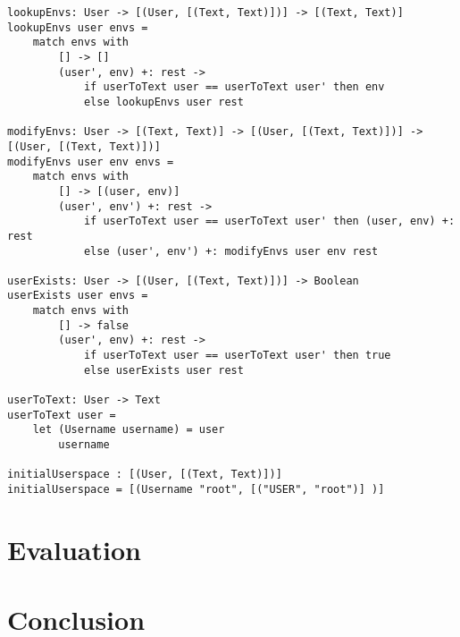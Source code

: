 \documentclass[logo,bsc,singlespacing,parskip]{infthesis}
\begin{document}
\begin{lstlisting}[language=unison]
lookupEnvs: User -> [(User, [(Text, Text)])] -> [(Text, Text)]
lookupEnvs user envs =
    match envs with
        [] -> []
        (user', env) +: rest ->
            if userToText user == userToText user' then env
            else lookupEnvs user rest

modifyEnvs: User -> [(Text, Text)] -> [(User, [(Text, Text)])] -> [(User, [(Text, Text)])]
modifyEnvs user env envs =
    match envs with
        [] -> [(user, env)]
        (user', env') +: rest ->
            if userToText user == userToText user' then (user, env) +: rest
            else (user', env') +: modifyEnvs user env rest

userExists: User -> [(User, [(Text, Text)])] -> Boolean
userExists user envs =
    match envs with
        [] -> false
        (user', env) +: rest ->
            if userToText user == userToText user' then true
            else userExists user rest

userToText: User -> Text
userToText user = 
    let (Username username) = user
        username

initialUserspace : [(User, [(Text, Text)])]
initialUserspace = [(Username "root", [("USER", "root")] )]
\end{lstlisting}

\chapter{Evaluation}

\chapter{Conclusion}



\end{document}
